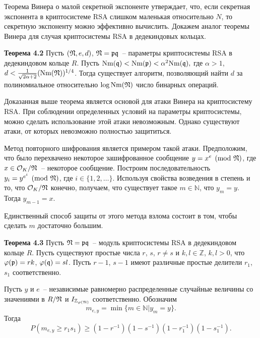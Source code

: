 \documentclass[_00_autoref.tex]{subfiles}
\begin{document}
Теорема Винера о малой секретной экспоненте утверждает, что, если секретная экспонента в криптосистеме RSA слишком маленькая относительно $N$, то секретную экспоненту можно эффективно вычислить.
Докажем аналог теоремы Винера для случая криптосистемы RSA в дедекиндовых кольцах.

\textbf{Теорема 4.2}\label{theorem:Wiener}
    Пусть $(\mathfrak{N}, e, d)$, $\mathfrak{N} = \mathfrak{p} \mathfrak{q}$~-- параметры криптосистемы RSA в дедекиндовом кольце $R$.
    Пусть $\textrm{Nm}(\mathfrak{q}) < \textrm{Nm}(\mathfrak{p}) < \alpha^2 \textrm{Nm}(\mathfrak{q}),$ где $\alpha > 1$, $d<\frac{1}{\sqrt{2\alpha+2}}(\textrm{Nm}(\mathfrak{N}))^{1/4}$.
    Тогда существует алгоритм, позволяющий найти $d$ за полиномиальное относительно $\log \textrm{Nm}(\mathfrak{N})$ число бинарных операций.

Доказанная выше теорема является основой для атаки Винера на криптосистему RSA.
При соблюдении определенных условий на параметры криптосистемы, можно сделать использование этой атаки невозможным.
Однако существуют атаки, от которых невозможно полностью защититься.

Метод повторного шифрования является примером такой атаки.
Предположим, что было перехвачено некоторое зашифрованное сообщение $y = x^e \pmod{\mathfrak{N}}$, где $x \in \mathcal{O}_K / \mathfrak{N}$~-- некоторое сообщение.
Построим последовательность $y_i = y^{e^i} \pmod{\mathfrak{N}}$, где $i \in \{1, 2, \ldots\}$.
Используя свойства возведения в степень и то, что $\mathcal{O}_K / \mathfrak{N}$ конечно, получаем, что существует такое $m \in \mathbb{N}$, что $y_m = y$.
Тогда $y_{m-1} = x$.

Единственный способ защиты от этого метода взлома состоит в том, чтобы сделать $m$ достаточно большим.

\textbf{Теорема 4.3}\label{theorem:iterated}
    Пусть $\mathfrak{N} = \mathfrak{p} \mathfrak{q}$~-- модуль криптосистемы RSA в дедекиндовом кольце $R$.
    Пусть существуют простые числа $r$, $s$, $r \neq s$ и $k, l \in \mathbb{Z}$, $k, l > 0$, что $\varphi(\mathfrak{p}) = rk$, $\varphi(\mathfrak{q}) = sl$.
    Пусть $r - 1$, $s - 1$ имеют различные простые делители $r_1$, $s_1$ соответственно.

    Пусть $y$ и $e$~-- независимые равномерно распределенные случайные величины со значениями в $R / \mathfrak{N}$ и $I_{\mathbb{Z}_{\varphi(\mathfrak{N})}}$ соответственно.
    Обозначим
    \begin{equation*}
        m_{e,y} = \min \{m \in \mathbb{N} | y_m = y\}.
    \end{equation*}
    Тогда
    \begin{equation*}
        P(m_{e,y} \ge r_1s_1)\ge(1-r^{-1})(1-s^{-1})(1-r_1^{-1})(1-s_1^{-1}).
    \end{equation*}
\end{document}

